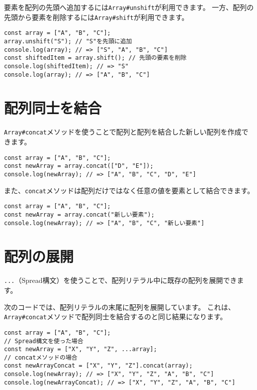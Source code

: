 要素を配列の先頭へ追加するには\texttt{Array\#unshift}が利用できます。
一方、配列の先頭から要素を削除するには\texttt{Array\#shift}が利用できます。

\begin{lstlisting}
const array = ["A", "B", "C"];
array.unshift("S"); // "S"を先頭に追加
console.log(array); // => ["S", "A", "B", "C"]
const shiftedItem = array.shift(); // 先頭の要素を削除 
console.log(shiftedItem); // => "S"
console.log(array); // => ["A", "B", "C"]
\end{lstlisting}

\hypertarget{concat}{%
\section{配列同士を結合}\label{concat}}

\texttt{Array\#concat}メソッドを使うことで配列と配列を結合した新しい配列を作成できます。

\begin{lstlisting}
const array = ["A", "B", "C"];
const newArray = array.concat(["D", "E"]);
console.log(newArray); // => ["A", "B", "C", "D", "E"]
\end{lstlisting}

また、\texttt{concat}メソッドは配列だけではなく任意の値を要素として結合できます。

\begin{lstlisting}
const array = ["A", "B", "C"];
const newArray = array.concat("新しい要素");
console.log(newArray); // => ["A", "B", "C", "新しい要素"]
\end{lstlisting}

\hypertarget{spread}{%
\section[配列の展開]{配列の展開\protect{}}\label{spread}}

\texttt{...}（Spread構文）を使うことで、配列リテラル中に既存の配列を展開できます。

次のコードでは、配列リテラルの末尾に配列を展開しています。
これは、\texttt{Array\#concat}メソッドで配列同士を結合するのと同じ結果になります。

\begin{lstlisting}
const array = ["A", "B", "C"];
// Spread構文を使った場合
const newArray = ["X", "Y", "Z", ...array];
// concatメソッドの場合
const newArrayConcat = ["X", "Y", "Z"].concat(array);
console.log(newArray); // => ["X", "Y", "Z", "A", "B", "C"]
console.log(newArrayConcat); // => ["X", "Y", "Z", "A", "B", "C"]
\end{lstlisting}

